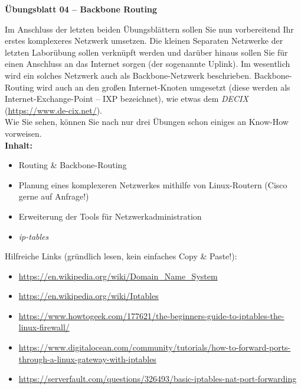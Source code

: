 \documentclass[paper=a4,fontsize=11pt]{scrartcl}%
\numberwithin{equation}{section}
\begin{document}
\begin{center}
\Large{\textbf{Übungsblatt 04 -- Backbone Routing}}\\
\end{center}
Im Anschluss der letzten beiden Übungsblättern sollen Sie nun vorbereitend Ihr erstes komplexeres Netzwerk umsetzen. Die kleinen Separaten Netzwerke der letzten Laborübung sollen verknüpft werden und darüber hinaus sollen Sie für einen Anschluss an das Internet sorgen (der sogenannte Uplink). Im wesentlich wird ein solches Netzwerk auch als Backbone-Netzwerk beschrieben. Backbone-Routing wird auch an den großen Internet-Knoten umgesetzt (diese werden als Internet-Exchange-Point -- IXP bezeichnet), wie etwas dem \emph{DECIX} (\url{https://www.de-cix.net/}).\\
Wie Sie sehen, können Sie nach nur drei Übungen schon einiges an Know-How vorweisen.\\
\textbf{Inhalt:}
\begin{itemize}
	\item Routing \& Backbone-Routing 
	\item Planung eines komplexeren Netzwerkes mithilfe von Linux-Routern (Cisco gerne auf Anfrage!)
	\item Erweiterung der Tools für Netzwerkadministration
	\item \emph{ip-tables}
\end{itemize}
Hilfreiche Links (gründlich lesen, kein einfaches Copy \& Paste!):
\begin{itemize}
	\item \url{https://en.wikipedia.org/wiki/Domain_Name_System}
	\item \url{https://en.wikipedia.org/wiki/Iptables}
	\item \url{https://www.howtogeek.com/177621/the-beginners-guide-to-iptables-the-linux-firewall/}
	\item \url{https://www.digitalocean.com/community/tutorials/how-to-forward-ports-through-a-linux-gateway-with-iptables}
	\item \url{https://serverfault.com/questions/326493/basic-iptables-nat-port-forwarding}
\end{itemize}
\end{document}
